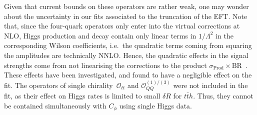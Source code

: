 Given that current bounds on these operators are rather weak, one may wonder about the uncertainty in our fits associated to the truncation of the EFT.
Note that, since the four-quark operators only enter into the virtual corrections at NLO, Higgs production and decay contain only linear terms in $1/\Lambda^{2}$ in the corresponding Wilson coefficients, i.e.~the quadratic terms coming from squaring the amplitudes are technically NNLO. 
Hence, the quadratic effects in the signal strengths come from not linearising the corrections to the product $\sigma_\mathrm{ Prod} \times \mathrm{ BR}$~\!.  These effects have been investigated, and found to have a negligible effect on the fit. 
The operators of single chirality~$\mathcal O_{tt}$ and $\mathcal{O}_{QQ}^{(1)/(3)}$ were not included in the fit, as their effect on Higgs rates is limited to small $\delta R$ for $t\bar t h$. Thus, they cannot be contained simultaneously with $C_\phi$ using single Higgs data.  
